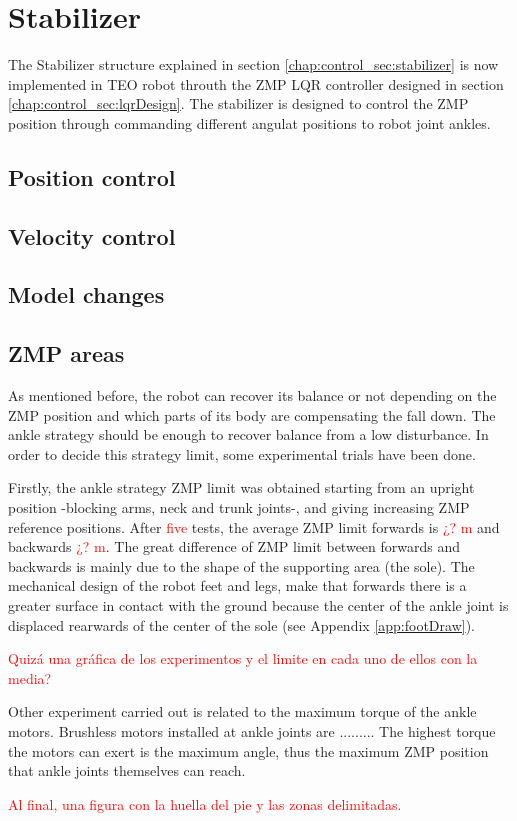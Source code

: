 \section{Stabilizer}
The Stabilizer structure explained in section \ref{chap:control_sec:stabilizer} is now implemented in TEO robot throuth the ZMP LQR controller designed in section \ref{chap:control_sec:lqrDesign}. The stabilizer is designed to control the ZMP position through commanding different angulat positions to robot joint ankles.

\subsection{Position control}

\subsection{Velocity control}

\subsection{Model changes}

\subsection{ZMP areas}
As mentioned before, the robot can recover its balance or not depending on the ZMP position and which parts of its body are compensating the fall down. The ankle strategy should be enough to recover balance from a low disturbance. In order to decide this strategy limit, some experimental trials have been done. 

Firstly, the ankle strategy ZMP limit was obtained starting from an upright position -blocking arms, neck and trunk joints-, and giving increasing ZMP reference positions. After \textcolor{red}{five} tests, the average ZMP limit forwards is \textcolor{red}{¿? m} and backwards \textcolor{red}{¿? m}. The great difference of ZMP limit between forwards and backwards is mainly due to the shape of the supporting area (the sole). The mechanical design of the robot feet and legs, make that forwards there is a greater surface in contact with the ground because the center of the ankle joint is displaced rearwards of the center of the sole (see Appendix \ref{app:footDraw}).

\textcolor{red}{Quizá una gráfica de los experimentos y el limite en cada uno de ellos con la media?}

Other experiment carried out is related to the maximum torque of the ankle motors. Brushless motors installed at ankle joints are ......... The highest torque the motors can exert is the maximum angle, thus the maximum ZMP position that ankle joints themselves can reach.


\textcolor{red}{Al final, una figura con la huella del pie y las zonas delimitadas.}

